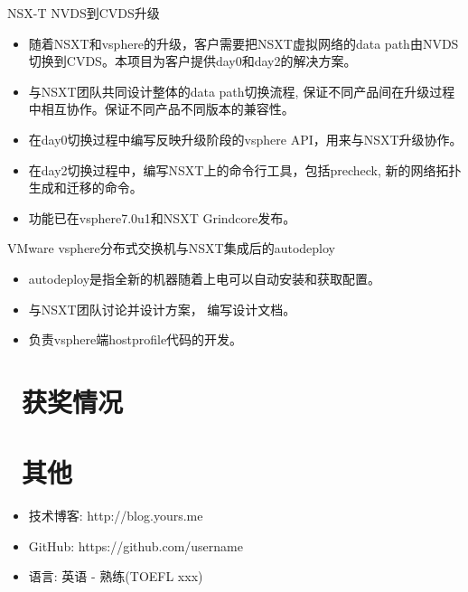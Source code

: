 \documentclass{resume}
\begin{document}
\begin{onehalfspacing}
NSX-T NVDS到CVDS升级
\begin{itemize}
  \item 随着NSXT和vsphere的升级，客户需要把NSXT虚拟网络的data path由NVDS切换到CVDS。本项目为客户提供day0和day2的解决方案。
  \item 与NSXT团队共同设计整体的data path切换流程, 保证不同产品间在升级过程中相互协作。保证不同产品不同版本的兼容性。
  \item 在day0切换过程中编写反映升级阶段的vsphere API，用来与NSXT升级协作。
  \item 在day2切换过程中，编写NSXT上的命令行工具，包括precheck, 新的网络拓扑生成和迁移的命令。
  \item 功能已在vsphere7.0u1和NSXT Grindcore发布。
\end{itemize}
\end{onehalfspacing}

\begin{onehalfspacing}
VMware vsphere分布式交换机与NSXT集成后的autodeploy
\begin{itemize}
  \item autodeploy是指全新的机器随着上电可以自动安装和获取配置。
  \item 与NSXT团队讨论并设计方案， 编写设计文档。
  \item 负责vsphere端hostprofile代码的开发。
\end{itemize}
\end{onehalfspacing}


\section{\faHeartO\ 获奖情况}

\section{\faInfo\ 其他}
\begin{itemize}[parsep=0.5ex]
  \item 技术博客: http://blog.yours.me
  \item GitHub: https://github.com/username
  \item 语言: 英语 - 熟练(TOEFL xxx)
\end{itemize}

%
%
\end{document}
